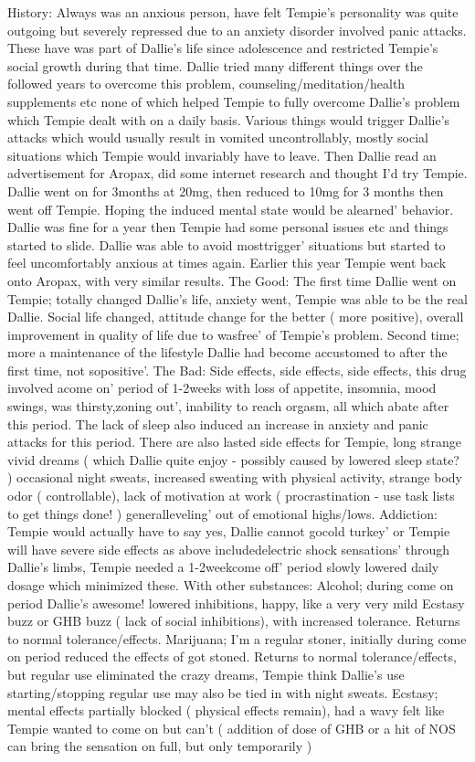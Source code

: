 \documentclass[12pt]{book}
\begin{document}
History: Always was an anxious person, have felt Tempie's personality was quite outgoing but severely repressed due to an anxiety disorder involved panic attacks. These have was part of Dallie's life since adolescence and restricted Tempie's social growth during that time. Dallie tried many different things over the followed years to overcome this problem, counseling/meditation/health supplements etc none of which helped Tempie to fully overcome Dallie's problem which Tempie dealt with on a daily basis. Various things would trigger Dallie's attacks which would usually result in vomited uncontrollably, mostly social situations which Tempie would invariably have to leave. Then Dallie read an advertisement for Aropax, did some internet research and thought I'd try Tempie. Dallie went on for 3months at 20mg, then reduced to 10mg for 3 months then went off Tempie. Hoping the induced mental state would be alearned' behavior. Dallie was fine for a year then Tempie had some personal issues etc and things started to slide. Dallie was able to avoid mosttrigger' situations but started to feel uncomfortably anxious at times again. Earlier this year Tempie went back onto Aropax, with very similar results. The Good: The first time Dallie went on Tempie; totally changed Dallie's life, anxiety went, Tempie was able to be the real Dallie. Social life changed, attitude change for the better ( more positive), overall improvement in quality of life due to wasfree' of Tempie's problem. Second time; more a maintenance of the lifestyle Dallie had become accustomed to after the first time, not sopositive'. The Bad: Side effects, side effects, side effects, this drug involved acome on' period of 1-2weeks with loss of appetite, insomnia, mood swings, was thirsty,zoning out', inability to reach orgasm, all which abate after this period. The lack of sleep also induced an increase in anxiety and panic attacks for this period. There are also lasted side effects for Tempie, long strange vivid dreams ( which Dallie quite enjoy - possibly caused by lowered sleep state? ) occasional night sweats, increased sweating with physical activity, strange body odor ( controllable), lack of motivation at work ( procrastination - use task lists to get things done! ) generalleveling' out of emotional highs/lows. Addiction: Tempie would actually have to say yes, Dallie cannot gocold turkey' or Tempie will have severe side effects as above includedelectric shock sensations' through Dallie's limbs, Tempie needed a 1-2weekcome off' period slowly lowered daily dosage which minimized these. With other substances: Alcohol; during come on period Dallie's awesome! lowered inhibitions, happy, like a very very mild Ecstasy buzz or GHB buzz ( lack of social inhibitions), with increased tolerance. Returns to normal tolerance/effects. Marijuana; I'm a regular stoner, initially during come on period reduced the effects of got stoned. Returns to normal tolerance/effects, but regular use eliminated the crazy dreams, Tempie think Dallie's use starting/stopping regular use may also be tied in with night sweats. Ecstasy; mental effects partially blocked ( physical effects remain), had a wavy felt like Tempie wanted to come on but can't ( addition of dose of GHB or a hit of NOS can bring the sensation on full, but only temporarily ) 
\end{document}
